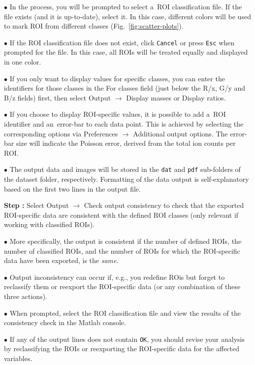 \documentclass[a4paper, 11pt]{article}
\newcommand{\ttt}[1]{\texttt{#1}}
\newcommand{\lans}[1]{{\color{magenta}#1}}
\newcommand{\lanstf}[1]{{\color{cyan}#1}}
\newcommand\ra{\rightarrow}
\newcounter{step}
\newcommand\s{\addtocounter{step}{1}\vskip5pt\noindent\textbf{Step \thestep:}{ }}
\newcommand\bul{\vskip5pt\noindent$\bullet${ }}
\begin{document}
\bul In the process, you will be prompted to select a~ROI classification file. If the file exists (and it is up-to-date), select it. In this case, different colors will be used to mark ROI from different classes (Fig.~\ref{fig:scatter-plots}). 

\bul If the ROI classification file does not exist, click \ttt{Cancel} or press \ttt{Esc} when prompted for the file. In this case, all ROIs will be treated equally and displayed in one color.

\bul If you only want to display values for specific classes, you can enter the identifiers for those classes in the \lanstf{For classes} field (just below the R/x, G/y and B/z fields) first, then select \lans{Output} $\ra$ \lans{Display masses} or \lans{Display ratios}.

\bul If you choose to display ROI-specific values, it is possible to add a~ROI identifier and an~error-bar to each data point. This is achieved by selecting the corresponding options via \lans{Preferences} $\ra$ \lans{Additional output options}. The error-bar size will indicate the Poisson error, derived from the total ion counts per ROI.

\bul The output data and images will be stored in the \ttt{dat} and \ttt{pdf} sub-folders of the dataset folder, respectively. Formatting of the data output is self-explanatory based on the first two lines in the output file.

\s Select \lans{Output} $\ra$ \lans{Check output consistency} to check that the exported ROI-specific data are consistent with the defined ROI  classes (only relevant if working with classified ROIs). 

\bul More specifically, the output is consistent if the number of defined ROIs, the number of classified ROIs, and the number of ROIs for which the ROI-specific data have been exported, is the \emph{same}.

\bul Output inconsistency can occur if, e.g., you redefine ROis but forget to reclassify them or reexport the ROI-specific data (or any combination of these three actions).

\bul When prompted, select the ROI classification file and view the results of the consistency check in the Matlab console. 

\bul If any of the output lines does not contain \ttt{OK}, you should revise your analysis by reclassifying the ROIs or reexporting the ROI-specific data for the affected variables.

\end{document}
